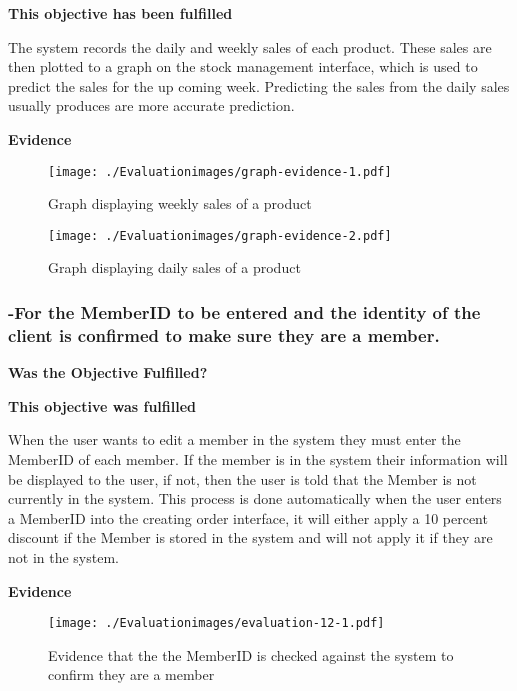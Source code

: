 \textbf{\large{This objective has been fulfilled}}


The system records the daily and weekly sales of each product. These sales are then plotted to a graph on the stock management interface, which is used to predict the sales for the up coming week. Predicting the sales from the daily sales usually produces are more accurate prediction.

\textbf{Evidence} \newline

\begin{figure}[H]
\caption{Graph displaying weekly sales of a product} \label{fig:graph-evidence-1.pdf}
\hfill\texttt{[image: ./Evaluationimages/graph-evidence-1.pdf]}
\end{figure}

\begin{figure}[H]
\caption{Graph displaying daily sales of a product} \label{fig:graph-evidence-2.pdf}
\hfill\texttt{[image: ./Evaluationimages/graph-evidence-2.pdf]}
\end{figure}




\pagebreak
\subsubsection{-For the MemberID to be entered and the identity of the client is confirmed to make sure they are a member.}

\textbf{Was the Objective Fulfilled?} \newline

\textbf{\large{This objective was fulfilled}}

When the user wants to edit a member in the system they must enter the MemberID of each member. If the member is in the system their information will be displayed to the user, if not, then the user is told that the Member is not currently in the system. This process is done automatically when the user enters a MemberID into the creating order interface, it will either apply a 10 percent discount if the Member is stored in the system and will not apply it if they are not in the system.

\textbf{Evidence} \newline

\begin{figure}[H]
\caption{Evidence that the the MemberID is checked against the system to confirm they are a member} \label{fig:evaluation-12-1}
\hfill\texttt{[image: ./Evaluationimages/evaluation-12-1.pdf]}
\end{figure}

